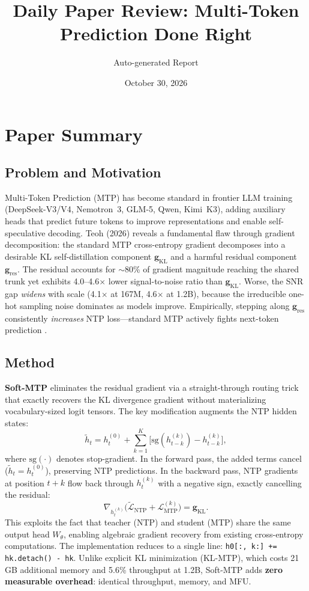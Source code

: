 \documentclass[11pt,a4paper]{article}
\title{Daily Paper Review: Multi-Token Prediction Done Right}
\author{Auto-generated Report}
\date{October 30, 2026}
\begin{document}
\maketitle

\section{Paper Summary}

\subsection{Problem and Motivation}
Multi-Token Prediction (MTP) has become standard in frontier LLM training (DeepSeek-V3/V4, Nemotron~3, GLM-5, Qwen, Kimi~K3), adding auxiliary heads that predict future tokens to improve representations and enable self-speculative decoding. Teoh (2026) reveals a fundamental flaw through gradient decomposition: the standard MTP cross-entropy gradient decomposes into a desirable KL self-distillation component $\mathbf{g}_{\mathrm{KL}}$ and a harmful residual component $\mathbf{g}_{\mathrm{res}}$. The residual accounts for ${\sim}$80\% of gradient magnitude reaching the shared trunk yet exhibits 4.0--4.6$\times$ lower signal-to-noise ratio than $\mathbf{g}_{\mathrm{KL}}$. Worse, the SNR gap \emph{widens} with scale (4.1$\times$ at 167M, 4.6$\times$ at 1.2B), because the irreducible one-hot sampling noise dominates as models improve. Empirically, stepping along $\mathbf{g}_{\mathrm{res}}$ consistently \emph{increases} NTP loss---standard MTP actively fights next-token prediction \cite{teoh2026softmtp}.

\subsection{Method}
\textbf{Soft-MTP} eliminates the residual gradient via a straight-through routing trick that exactly recovers the KL divergence gradient without materializing vocabulary-sized logit tensors. The key modification augments the NTP hidden states:
\begin{equation}
  \tilde{h}_t = h^{(0)}_t + \sum_{k=1}^{K}\bigl[\mathrm{sg}(h^{(k)}_{t-k}) - h^{(k)}_{t-k}\bigr],
\end{equation}
where $\mathrm{sg}(\cdot)$ denotes stop-gradient. In the forward pass, the added terms cancel ($\tilde{h}_t = h^{(0)}_t$), preserving NTP predictions. In the backward pass, NTP gradients at position $t{+}k$ flow back through $h^{(k)}_t$ with a negative sign, exactly cancelling the residual:
\begin{equation}
  \nabla_{h^{(k)}_t}\bigl(\tilde{\mathcal{L}}_{\mathrm{NTP}} + \mathcal{L}^{(k)}_{\mathrm{MTP}}\bigr) = \mathbf{g}_{\mathrm{KL}}.
\end{equation}
This exploits the fact that teacher (NTP) and student (MTP) share the same output head $W_\theta$, enabling algebraic gradient recovery from existing cross-entropy computations. The implementation reduces to a single line: \texttt{h0[:, k:] += hk.detach() - hk}. Unlike explicit KL minimization (KL-MTP), which costs 21\,GB additional memory and 5.6\% throughput at 1.2B, Soft-MTP adds \textbf{zero measurable overhead}: identical throughput, memory, and MFU.
\end{document}

